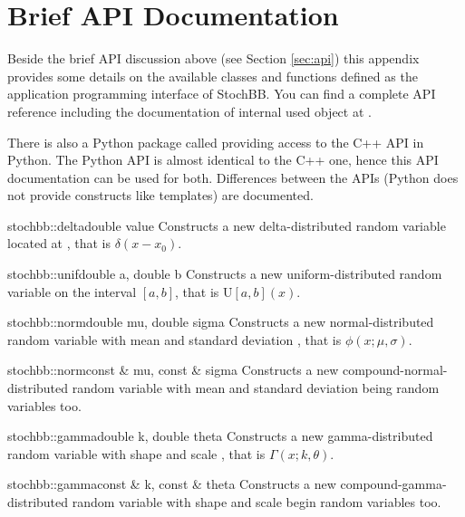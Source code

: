 \section{Brief API Documentation} \label{sec::apidoc}
Beside the brief API discussion above (see Section \ref{sec:api}) this appendix
provides some details on the available classes and  functions defined as the
application programming interface of StochBB. You can find a complete API
reference including the documentation of internal used object at \citep{stochbbapi}.

There is also a Python package called  providing access to the C++
API in Python. The Python API is almost identical to the C++ one, hence this 
API documentation can be used for both. Differences between the APIs (Python 
does not provide constructs like templates) are documented.

\begin{deffunc}{stochbb::delta}{}{double value}	
 Constructs a new delta-distributed random variable located at , that is $\delta(x-x_0)$.
\end{deffunc}

\begin{deffunc}{stochbb::unif}{}{double a, double b}	
Constructs a new uniform-distributed random variable on the interval $[a,b]$, that is $\text{U}[a,b](x)$.
\end{deffunc}

\begin{deffunc}{stochbb::norm}{}{double mu, double sigma}
Constructs a new normal-distributed random variable with mean  and 
standard deviation  , that is $\phi(x;\mu, \sigma)$.
\end{deffunc}

\begin{deffunc*}{stochbb::norm}{}{const \& mu, const \& sigma}
Constructs a new compound-normal-distributed random variable with mean  and 
standard deviation  being random variables too.
\end{deffunc*}

\begin{deffunc}{stochbb::gamma}{}{double k, double theta}
Constructs a new gamma-distributed random variable with shape  and 
scale  , that is $\Gamma(x; k, \theta)$.
\end{deffunc}

\begin{deffunc*}{stochbb::gamma}{}{const \& k, const \& theta}
Constructs a new compound-gamma-distributed random variable with shape  and 
scale  begin random variables too.
\end{deffunc*}

